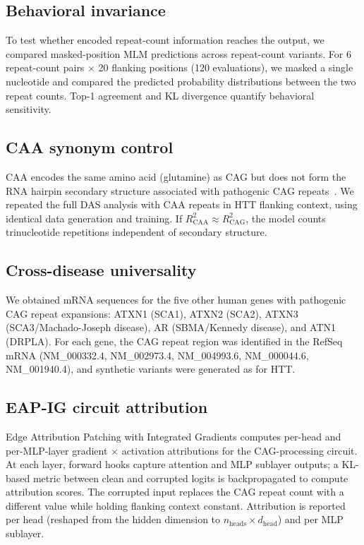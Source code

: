 \documentclass[11pt]{article}
\begin{document}
\subsection{Behavioral invariance}

To test whether encoded repeat-count information reaches the output, we
compared masked-position MLM predictions across repeat-count variants.
For 6 repeat-count pairs $\times$ 20 flanking positions (120
evaluations), we masked a single nucleotide and compared the
predicted probability distributions between the two repeat counts.
Top-1 agreement and KL divergence quantify behavioral sensitivity.

\subsection{CAA synonym control}

CAA encodes the same amino acid (glutamine) as CAG but does not form
the RNA hairpin secondary structure associated with pathogenic CAG
repeats~\citep{demezer2011}. We repeated the full DAS analysis with
CAA repeats in HTT flanking context, using identical data generation
and training. If $R^2_{\mathrm{CAA}} \approx R^2_{\mathrm{CAG}}$,
the model counts trinucleotide repetitions independent of secondary
structure.

\subsection{Cross-disease universality}

We obtained mRNA sequences for the five other human genes with
pathogenic CAG repeat expansions: ATXN1 (SCA1), ATXN2 (SCA2),
ATXN3 (SCA3/Machado-Joseph disease), AR (SBMA/Kennedy disease),
and ATN1 (DRPLA). For each gene, the CAG repeat region was identified
in the RefSeq mRNA (NM\_000332.4, NM\_002973.4, NM\_004993.6,
NM\_000044.6, NM\_001940.4), and synthetic variants were generated
as for HTT.

\subsection{EAP-IG circuit attribution}

Edge Attribution Patching with Integrated Gradients computes per-head
and per-MLP-layer gradient $\times$ activation attributions for the
CAG-processing circuit. At each layer, forward hooks capture attention
and MLP sublayer outputs; a KL-based metric between clean and corrupted
logits is backpropagated to compute attribution scores. The corrupted
input replaces the CAG repeat count with a different value while
holding flanking context constant. Attribution is reported per head
(reshaped from the hidden dimension to $n_{\mathrm{heads}} \times
d_{\mathrm{head}}$) and per MLP sublayer.
\end{document}
